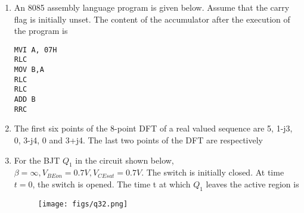 \documentclass[a4paper, 11pt]{article}
\begin{document}
\begin{enumerate}
    \hfill{}

    \item An 8085 assembly language program is given below. Assume that the carry flag is initially unset. The content of the accumulator after the execution of the program is
    
    \begin{lstlisting}
MVI A, 07H
RLC
MOV B,A
RLC
RLC
ADD B
RRC
    \end{lstlisting}
    
    \begin{enumerate}
    \end{enumerate}

    \hfill{}

    \item The first six points of the 8-point DFT of a real valued sequence are 5, 1-j3, 0, 3-j4, 0 and 3+j4. The last two points of the DFT are respectively
    
    \begin{enumerate}
    \end{enumerate}
    
    \hfill{}

    \item For the BJT $Q_{1}$ in the circuit shown below, $\beta=\infty, V_{BEon}=0.7V, V_{CEsat}=0.7V$. The switch is initially closed. At time $t=0$, the switch is opened. The time t at which $Q_{1}$ leaves the active region is
    
    \begin{figure}[H]
        \centering
        \texttt{[image: figs/q32.png]}
        \caption*{}
        \label{fig:q32}
    \end{figure}
    

\end{enumerate}
\end{document}
